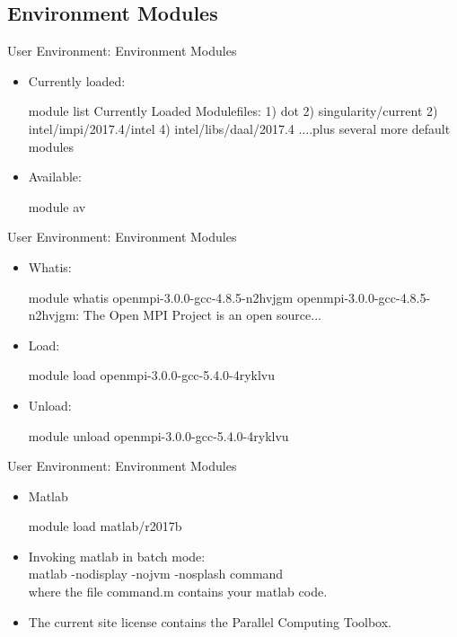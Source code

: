 \subsection{Environment Modules}
\begin{frame}[fragile]{User Environment: Environment Modules}
\begin{itemize}
\item{Currently loaded:}
\begin{semiverbatim}
\scriptsize
module list
Currently Loaded Modulefiles:
 1) dot                            2) singularity/current            2) intel/impi/2017.4/intel       4) intel/libs/daal/2017.4
....plus several more default modules
\end{semiverbatim}
\medskip
\item{Available:}
\begin{semiverbatim}
\scriptsize
module av
\end{semiverbatim}
\end{itemize}
\end{frame}

\begin{frame}[fragile]{User Environment: Environment Modules}
\begin{itemize}
\item{Whatis:}
\begin{semiverbatim}
\tiny
module whatis openmpi-3.0.0-gcc-4.8.5-n2hvjgm
openmpi-3.0.0-gcc-4.8.5-n2hvjgm: The Open MPI Project is an open source...
\end{semiverbatim}
\medskip
\item{Load:}
\begin{semiverbatim}
\scriptsize
module load openmpi-3.0.0-gcc-5.4.0-4ryklvu
\end{semiverbatim}
\medskip
\item{Unload:}
\begin{semiverbatim}
\scriptsize
module unload openmpi-3.0.0-gcc-5.4.0-4ryklvu
\end{semiverbatim}
\end{itemize}
\end{frame}

\begin{frame}[fragile]{User Environment: Environment Modules}
\begin{itemize}
\item{Matlab}
\begin{semiverbatim}
\scriptsize
module load matlab/r2017b
\end{semiverbatim}
\medskip\pause
\item{Invoking matlab in batch mode:\hfill\\
  \qquad \alert{matlab -nodisplay -nojvm -nosplash command}\hfill\\
  where the file \alert{command.m} contains your matlab code.}
  \pause
  \item{The current site license contains the Parallel Computing Toolbox.}
\end{itemize}
\end{frame}


